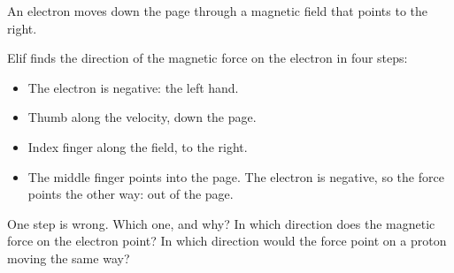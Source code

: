 An electron moves down the page through a magnetic field that points to the right.

\begin{center}
\end{center}

Elif finds the direction of the magnetic force on the electron in four steps:
\begin{itemize}
\item[1.] The electron is negative: the left hand.
\item[2.] Thumb along the velocity, down the page.
\item[3.] Index finger along the field, to the right.
\item[4.] The middle finger points into the page. The electron is negative, so the force points the other way: out of the page.
\end{itemize}

\begin{abcliste}
\abc One step is wrong. Which one, and why?
\abc In which direction does the magnetic force on the electron point?
\abc In which direction would the force point on a proton moving the same way?
\end{abcliste}
